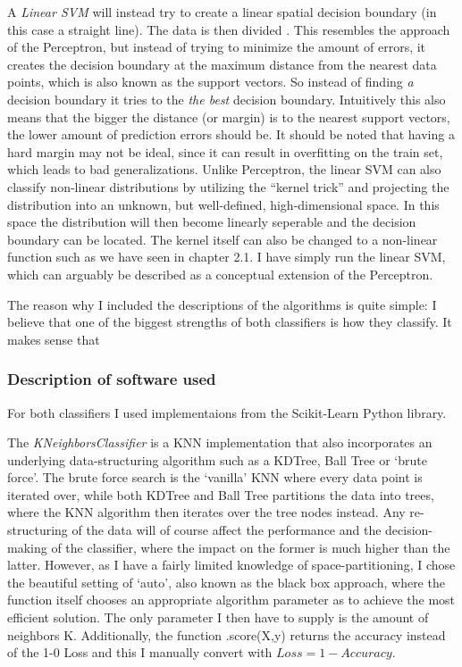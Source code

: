 \documentclass{article}
\theoremstyle{plain}
\theoremstyle{nonumberplain}
\begin{document}
A \textit{Linear SVM} will instead try to create a linear spatial decision boundary (in this case a straight line). The data is then divided   . This resembles the approach of the Perceptron, but instead of trying to minimize the amount of errors, it creates the decision boundary at the maximum distance from the nearest data points, which is also known as the support vectors. So instead of finding \textit{a} decision boundary it tries to the \textit{the best} decision boundary.
Intuitively this also means that the bigger the distance (or margin) is to the nearest support vectors, the lower amount of prediction errors should be.
It should be noted that having a hard margin may not be ideal, since it can result in overfitting on the train set, which leads  to bad generalizations.
Unlike Perceptron, the linear SVM can also classify non-linear distributions by utilizing the ``kernel trick'' and projecting the distribution into an unknown, but well-defined, high-dimensional space. In this space the distribution will then become linearly seperable and the decision boundary can be located.
The kernel itself can also be changed to a non-linear function such as we have seen in chapter 2.1.
I have simply run the linear SVM, which can arguably be described as a conceptual extension of the Perceptron. \medskip


The reason why I included the descriptions of the algorithms is quite simple: I believe that one of the biggest strengths of both classifiers is how they classify. 
It makes sense that 


\subsubsection{Description of software used}
For both classifiers I used implementaions from the Scikit-Learn Python library\cite{website:sklearn}. \medskip

The \textit{KNeighborsClassifier} is a KNN implementation that also incorporates an underlying data-structuring algorithm such as a KDTree, Ball Tree or `brute force'\cite{website:knn-sklearn}. 
The brute force search is the `vanilla' KNN where every data point is iterated over, while both KDTree and Ball Tree partitions the data into trees, where the KNN algorithm then iterates over the tree nodes instead.
Any re-structuring of the data will of course affect the performance and the decision-making of the classifier, where the impact on the former is much higher than the latter. 
However, as I have a fairly limited knowledge of space-partitioning, I chose the beautiful setting of `auto', also known as the black box approach, where the function itself chooses an appropriate algorithm parameter as to achieve the most efficient solution. The only parameter I then have to supply is the amount of neighbors K. Additionally, the function .score(X,y) returns the accuracy instead of the 1-0 Loss and this I manually convert with $Loss = 1 - Accuracy$. \medskip
\end{document}

